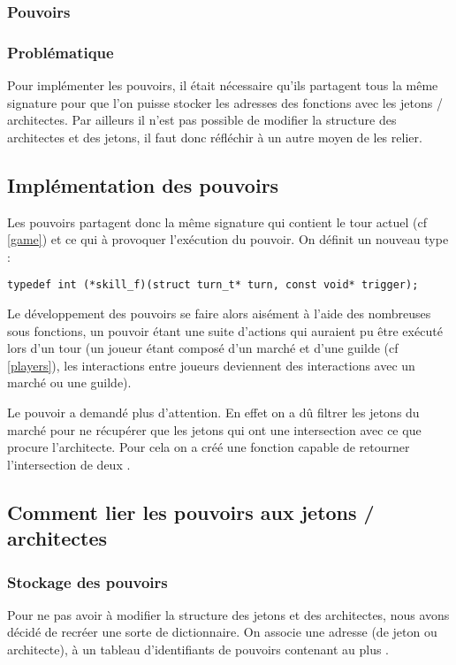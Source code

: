 \subsubsection{Pouvoirs}

\label{skills}

\subsubsection*{Problématique}

Pour implémenter les pouvoirs, il était nécessaire qu'ils partagent tous la même signature pour que l'on puisse stocker les adresses des fonctions avec les jetons / architectes. Par ailleurs il n'est pas possible de modifier la structure des architectes et des jetons, il faut donc réfléchir à un autre moyen de les relier.

\subsection*{Implémentation des pouvoirs}

Les pouvoirs partagent donc la même signature qui contient le tour actuel (cf \ref{game}) et ce qui à provoquer l'exécution du pouvoir. On définit un nouveau type :

\begin{lstlisting}[frame=single, caption={Signature des pouvoirs}]
typedef int (*skill_f)(struct turn_t* turn, const void* trigger);
\end{lstlisting}

Le développement des pouvoirs se faire alors aisément à l'aide des nombreuses sous fonctions, un pouvoir étant une suite d'actions qui auraient pu être exécuté lors d'un tour (un joueur étant composé d'un marché et d'une guilde (cf \ref{players}), les interactions entre joueurs deviennent des interactions avec un marché ou une guilde).

Le pouvoir  a demandé plus d'attention. En effet on a dû filtrer les jetons du marché pour ne récupérer que les jetons qui ont une intersection avec ce que procure l'architecte. Pour cela on a créé une fonction capable de retourner l'intersection de deux .

\subsection*{Comment lier les pouvoirs aux jetons / architectes}

\subsubsection*{Stockage des pouvoirs}
Pour ne pas avoir à modifier la structure des jetons et des architectes, nous avons décidé de recréer une sorte de dictionnaire. On associe une adresse (de jeton ou architecte), à un tableau d'identifiants de pouvoirs contenant au plus .

